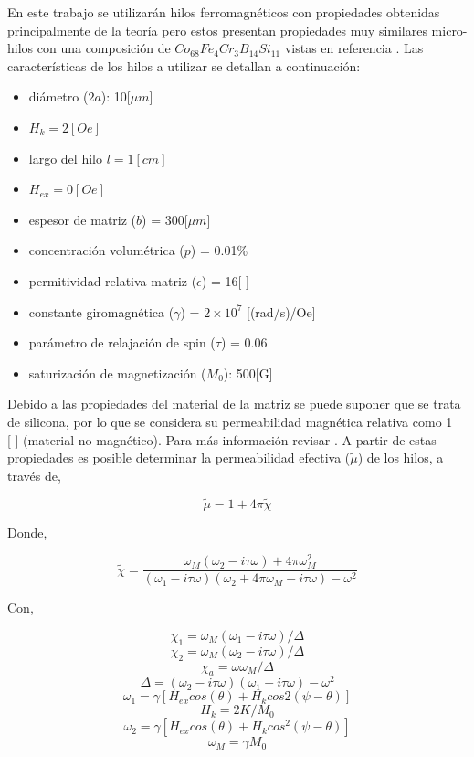 \documentclass[12pt,letterpaper]{article}
\numberwithin{equation}{section}
\begin{document}
En este trabajo se utilizarán hilos ferromagnéticos con propiedades obtenidas principalmente de la teoría pero estos presentan propiedades muy similares micro-hilos con una composición de $Co_{68}Fe_4Cr_3B_{14}Si_{11}$ vistas en referencia \cite{Wire_theory_2}. Las características de los hilos a utilizar se detallan a continuación:

\begin{itemize}
	\item diámetro ($2a$): 10[$\mu m$] 
	\item $H_k = 2[Oe]$
	\item largo del hilo $l = 1 [cm]$
	\item $H_{ex} = 0 [Oe]$
	\item espesor de matriz ($b$) = 300[$\mu m$]
	\item concentración volumétrica ($p$) = 0.01\%
	\item permitividad relativa matriz ($\epsilon$) = 16[-]
	\item constante giromagnética ($\gamma$) = $2\times10^7$ [(rad/s)/Oe]
	\item parámetro de relajación de spin ($\tau$) = 0.06
	\item saturización de magnetización ($M_0$): 500[G]  
\end{itemize}

Debido a las propiedades del material de la matriz se puede suponer que se trata de silicona, por lo que se considera su permeabilidad magnética relativa como 1 [-] (material no magnético). Para más información revisar \cite{Wire_theory_1,Wire_theory_2}. A partir de estas propiedades es posible determinar la permeabilidad efectiva ($\tilde{\mu}$) de los hilos, a través de,

\begin{equation}
	\tilde{\mu}=1+4\pi\tilde{\chi}
	\label{permeabilidad}
\end{equation}

Donde, 

$$\tilde{\chi}=\frac{\omega_M(\omega_2-i\tau\omega)+4\pi\omega^2_M}{(\omega_1-i\tau\omega)(\omega_2+4\pi\omega_M-i\tau\omega)-\omega^2}$$

Con, 

$$\chi_1=\omega_M(\omega_1-i\tau\omega)/\Delta$$
$$\chi_2=\omega_M(\omega_2-i\tau\omega)/\Delta$$ $$\chi_a=\omega\omega_M/\Delta$$ $$\Delta=(\omega_2-i\tau\omega)(\omega_1-i\tau\omega)-\omega^2$$ $$\omega_1=\gamma[H_{ex}cos(\theta)+H_kcos2(\psi-\theta)]$$
$$H_k=2K/M_0$$
$$\omega_2=\gamma[H_{ex}cos(\theta)+H_kcos^2(\psi-\theta)]$$ $$\omega_M=\gamma M_0$$
\end{document}
